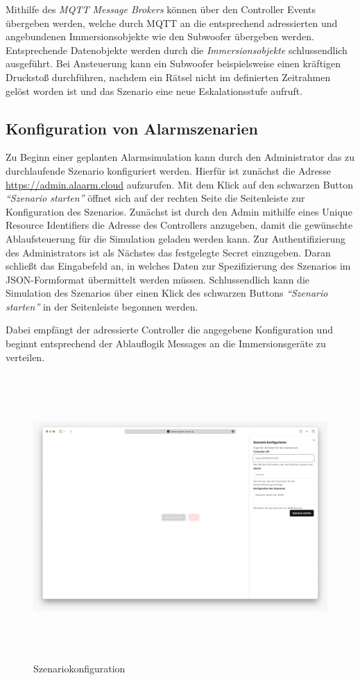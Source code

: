 Mithilfe des \textit{MQTT Message Brokers} können über den Controller Events übergeben werden, welche durch MQTT an die entsprechend adressierten und angebundenen Immersionsobjekte wie den Subwoofer übergeben werden. Entsprechende Datenobjekte werden durch die \textit{Immersionsobjekte} schlussendlich ausgeführt. Bei Ansteuerung kann ein Subwoofer beispielsweise einen kräftigen Druckstoß durchführen, nachdem ein Rätsel nicht im definierten Zeitrahmen gelöst worden ist und das Szenario eine neue Eskalationsstufe aufruft. 

\subsection{Konfiguration von Alarmszenarien}

Zu Beginn einer geplanten Alarmsimulation kann durch den Administrator das zu durchlaufende Szenario konfiguriert werden. Hierfür ist zunächst die Adresse \href{https://admin.alaarm.cloud}{https://admin.alaarm.cloud} aufzurufen. Mit dem Klick auf den schwarzen Button \textit{\enquote{Szenario starten}} öffnet sich auf der rechten Seite die Seitenleiste zur Konfiguration des Szenarios. Zunächst ist durch den Admin mithilfe eines Unique Resource Identifiers die Adresse des Controllers anzugeben, damit die gewünschte Ablaufsteuerung für die Simulation geladen werden kann. Zur Authentifizierung des Administrators ist als Nächstes das festgelegte Secret einzugeben. Daran schließt das Eingabefeld an, in welches Daten zur Spezifizierung des Szenarios im JSON-Formformat übermittelt werden müssen.
Schlussendlich kann die Simulation des Szenarios über einen Klick des schwarzen Buttons \textit{\enquote{Szenario starten}} in der Seitenleiste begonnen werden.

Dabei empfängt der adressierte Controller die angegebene Konfiguration und beginnt entsprechend der Ablauflogik Messages an die Immersionsgeräte zu verteilen.

\begin{figure}[h]
   \includegraphics[width=15cm, height=10.87cm]{res/20230821_Szenario_Configuration.jpg}
   \caption{Szenariokonfiguration}
\end{figure}



